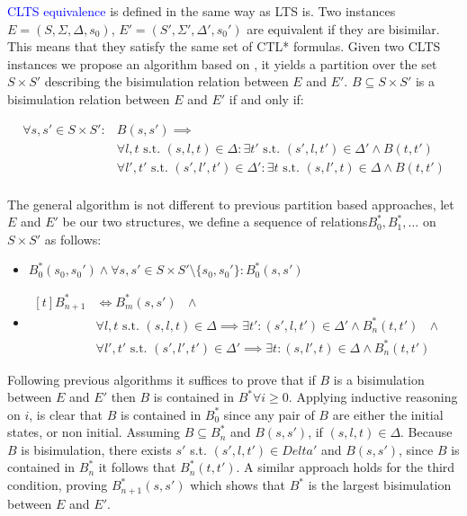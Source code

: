 \textcolor{blue}{CLTS equivalence} is defined in the same way as LTS is. Two instances $E =  (S, \Sigma, \Delta, s_0)$,
$E' =  (S', \Sigma', \Delta', s_0')$ are equivalent if they are bisimilar. This means that they satisfy the same set of CTL* formulas. Given two CLTS instances we propose an algorithm based on \cite{paige1987three}, it yields a partition over the set $S \times S'$ describing the bisimulation relation between $E$ and $E'$.
$B \subseteq S \times S'$ is a bisimulation relation between $E$ and $E'$ if and only if:

\[\begin{aligned}
	\forall s, s' \in S \times S': & B(s,s') \implies \\
	&\forall l,t \text{ s.t. } (s,l,t) \in \Delta  :\exists t' \text{ s.t. } (s',l,t') \in \Delta' \wedge B(t,t')\\
	&\forall l',t' \text{ s.t. } (s',l',t') \in \Delta' :\exists t \text{ s.t. } (s,l',t) \in \Delta \wedge B(t,t')\\	
\end{aligned}\]

The general algorithm is not different to previous partition based approaches, let $E$ and $E'$ be our two structures, we define a sequence of relations$B_0^*,B_1^*,\ldots$ on $S \times S'$ as follows:

\begin{itemize}
	\item $B_0^*(s_0,s_0') \wedge \forall s,s' \in S \times S' \setminus \{s_0,s_0'\}: B_0^*(s,s')$
	\item $\begin{aligned}[t]
	B_{n+1}^*& \iff B_m^*(s,s') \text{ } \wedge\\
		&\forall l,t \text{ s.t. }(s,l,t) \in \Delta \implies \exists t':(s',l,t') \in \Delta' \wedge B_n^*(t,t') \text{ } \wedge\\
		&\forall l',t' \text{ s.t. }(s',l',t') \in \Delta' \implies \exists t:(s,l',t) \in \Delta \wedge B_n^*(t,t')\end{aligned}$
\end{itemize}

Following previous algorithms it suffices to prove that if $B$ is a bisimulation between $E$ and $E'$ then $B$ is contained in $B^* \forall i \geq 0$.  Applying inductive reasoning on $i$, is clear that $B$ is contained in $B_0^*$ since any pair of $B$ are either the initial states, or non initial. Assuming 
$B \subseteq B_n^*$ and $B(s,s')$, if $(s,l,t) \in \Delta$. Because $B$ is bisimulation, there exists $s'$ s.t. $(s',l,t') \in Delta'$ and $B(s,s')$, since $B$ is contained in $B_n^*$ it follows that $B_n^*(t,t')$.
A similar approach holds for the third condition, proving $B_{n+1}^*(s,s')$ which shows that $B^*$ is the largest bisimulation between $E$ and $E'$.

